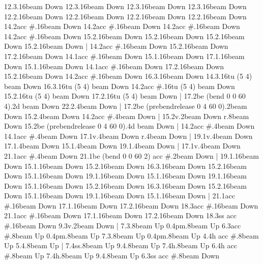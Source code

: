       12.3.16{beam Down}
      12.3.16{beam Down}
      12.3.16{beam Down}
      12.3.16{beam Down}
      12.2.16{beam Down}
      12.2.16{beam Down}
      12.2.16{beam Down}
      12.2.16{beam Down}
      14.2{acc #}.16{beam Down}
      14.2{acc #}.16{beam Down}
      14.2{acc #}.16{beam Down}
      14.2{acc #}.16{beam Down}
      15.2.16{beam Down}
      15.2.16{beam Down}
      15.2.16{beam Down}
      15.2.16{beam Down}
    |
      14.2{acc #}.16{beam Down}
      15.2.16{beam Down}
      17.2.16{beam Down}
      14.1{acc #}.16{beam Down}
      15.1.16{beam Down}
      17.1.16{beam Down}
      15.1.16{beam Down}
      14.1{acc #}.16{beam Down}
      17.2.16{beam Down}
      15.2.16{beam Down}
      14.2{acc #}.16{beam Down}
      16.3.16{beam Down}
      14.3.16{tu (5 4) beam Down}
      16.3.16{tu (5 4) beam Down}
      14.2{acc #}.16{tu (5 4) beam Down}
      15.2.16{tu (5 4) beam Down}
      17.2.16{tu (5 4) beam Down}
    |
      17.2{be (bend 0 0 60 4)}.2{d beam Down}
      22.2.4{beam Down}
    |
      17.2{be (prebendrelease 0 4 60 0)}.2{beam Down}
      15.2.4{beam Down}
      14.2{acc #}.4{beam Down}
    |
      15.2{v}.2{beam Down}
      r.8{beam Down}
      15.2{be (prebendrelease 0 4 60 0)}.4{d beam Down}
    |
      14.2{acc #}.4{beam Down}
      14.1{acc #}.4{beam Down}
      17.1{v}.4{beam Down}
      r.4{beam Down}
    |
      19.1{v}.4{beam Down}
      17.1.4{beam Down}
      15.1.4{beam Down}
      19.1.4{beam Down}
    |
      17.1{v}.4{beam Down}
      21.1{acc #}.4{beam Down}
      21.1{be (bend 0 0 60 2) acc #}.2{beam Down}
    |
      19.1.16{beam Down}
      15.1.16{beam Down}
      15.2.16{beam Down}
      16.3.16{beam Down}
      15.2.16{beam Down}
      15.1.16{beam Down}
      19.1.16{beam Down}
      15.1.16{beam Down}
      19.1.16{beam Down}
      15.1.16{beam Down}
      15.2.16{beam Down}
      16.3.16{beam Down}
      15.2.16{beam Down}
      15.1.16{beam Down}
      19.1.16{beam Down}
      15.1.16{beam Down}
    |
      21.1{acc #}.16{beam Down}
      17.1.16{beam Down}
      17.2.16{beam Down}
      18.3{acc #}.16{beam Down}
      21.1{acc #}.16{beam Down}
      17.1.16{beam Down}
      17.2.16{beam Down}
      18.3{ss acc #}.16{beam Down}
      9.3{v}.2{beam Down}
    |
      7.3.8{beam Up}
      0.4{pm}.8{beam Up}
      6.3{acc #}.8{beam Up}
      0.4{pm}.8{beam Up}
      7.3.8{beam Up}
      0.4{pm}.8{beam Up}
      4.4{h acc #}.8{beam Up}
      5.4.8{beam Up}
    |
      7.4{ss}.8{beam Up}
      9.4.8{beam Up}
      7.4{h}.8{beam Up}
      6.4{h acc #}.8{beam Up}
      7.4{h}.8{beam Up}
      9.4.8{beam Up}
      6.3{ss acc #}.8{beam Down}
